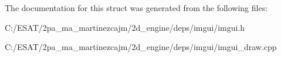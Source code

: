 The documentation for this struct was generated from the following files\+:\begin{DoxyCompactItemize}
\item 
C\+:/\+E\+S\+A\+T/2pa\+\_\+ma\+\_\+martinezcajm/2d\+\_\+engine/deps/imgui/imgui.\+h\item 
C\+:/\+E\+S\+A\+T/2pa\+\_\+ma\+\_\+martinezcajm/2d\+\_\+engine/deps/imgui/imgui\+\_\+draw.\+cpp\end{DoxyCompactItemize}
